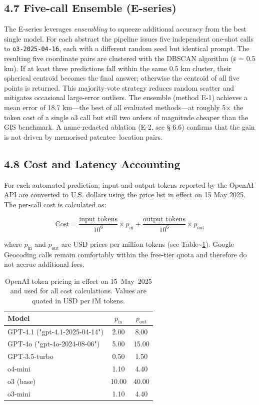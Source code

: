 \documentclass[
  10pt,
  twocolumn]{article}
\begin{document}
\subsection{4.7 Five-call Ensemble
(E-series)}\label{five-call-ensemble-e-series}

The E-series leverages \emph{ensembling} to squeeze additional accuracy
from the best single model. For each abstract the pipeline issues five
independent one-shot calls to \passthrough{\lstinline!o3-2025-04-16!},
each with a different random seed but identical prompt. The resulting
five coordinate pairs are clustered with the DBSCAN algorithm (ε = 0.5
km). If at least three predictions fall within the same 0.5 km cluster,
their spherical centroid becomes the final answer; otherwise the
centroid of all five points is returned. This majority-vote strategy
reduces random scatter and mitigates occasional large-error outliers.
The ensemble (method E-1) achieves a mean error of 18.7 km---the best of
all evaluated methods---at roughly 5× the token cost of a single o3 call
but still two orders of magnitude cheaper than the GIS benchmark. A
name-redacted ablation (E-2, see § 6.6) confirms that the gain is not
driven by memorised patentee--location pairs.

\subsection{4.8 Cost and Latency
Accounting}\label{cost-and-latency-accounting}

For each automated prediction, input and output tokens reported by the
OpenAI API are converted to U.S. dollars using the price list in effect
on 15 May 2025. The per-call cost is calculated as:

\[
\text{Cost} = \frac{\text{input tokens}}{10^{6}} \times p_{\text{in}} + \frac{\text{output tokens}}{10^{6}} \times p_{\text{out}}
\]

where \(p_{\text{in}}\) and \(p_{\text{out}}\) are USD prices per
million tokens (see Table\textasciitilde{}\ref{tbl:prices}). Google
Geocoding calls remain comfortably within the free-tier quota and
therefore do not accrue additional fees.

\begin{table}[H]
\centering
\caption{OpenAI token pricing in effect on 15~May~2025 and used for all cost calculations.  Values are quoted in USD per\,1M tokens.}
\label{tbl:prices}
\begin{tabular}{lcc}
\toprule
Model & $p_{\text{in}}$ & $p_{\text{out}}$ \\
\midrule
GPT-4.1 ("gpt-4.1-2025-04-14") & 2.00 & 8.00 \\
GPT-4o ("gpt-4o-2024-08-06") & 5.00 & 15.00 \\
GPT-3.5-turbo & 0.50 & 1.50 \\
o4-mini & 1.10 & 4.40 \\
o3 (base) & 10.00 & 40.00 \\
o3-mini & 1.10 & 4.40 \\
\bottomrule
\end{tabular}
\end{table}
\end{document}
